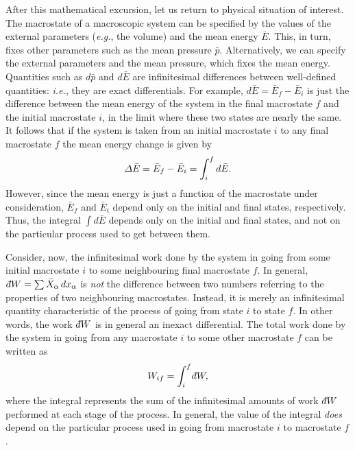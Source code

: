 After this mathematical excursion, let us return to physical situation of interest.
The macrostate of a macroscopic system can be specified by the values of the
external parameters ({\em e.g.}, the volume) and the mean energy $\bar{E}$. This, in
turn, fixes other parameters such as the mean pressure $\bar{p}$. Alternatively,
we can specify the external parameters and the mean pressure, which fixes the 
mean energy. Quantities such as $d\bar{p}$ and $d\bar{E}$ are infinitesimal
differences between well-defined quantities: {\em i.e.},
 they are exact differentials.
For example, $d\bar{E} = \bar{E}_f - \bar{E}_i$ is just the difference between the
mean energy of the system in the final macrostate $f$ and  the
initial macrostate $i$, in the limit where these two states are nearly the same.
It follows that if the system is taken from an initial macrostate $i$ to any
final macrostate $f$ the mean energy change is given by 
\begin{equation}
{\mit\Delta} \bar{E} = \bar{E}_f - \bar{E}_i = \int_{i}^f d\bar{E}.
\end{equation}
However, since the mean energy is just a function of the macrostate under consideration, $\bar{E}_f$ and $\bar{E}_i$ depend only on the  initial and final
states, respectively.
 Thus, the integral $\int d\bar{E}$ depends only on the initial and final
states, and not on the particular process  used to get between them.

Consider, now, the infinitesimal work done by the system in going from some
initial macrostate $i$ to some neighbouring final macrostate $f$. In general, 
$\,\dbar W = \sum \bar{X}_\alpha\,dx_\alpha$ is {\em not}\/ the difference between two
numbers referring to the properties of two neighbouring macrostates. Instead,
it is merely an infinitesimal quantity characteristic of the process of going
from state $i$ to state $f$. In other words, the work $\,\dbar W$ is in general
an inexact differential. The total work done by the system in going from any
macrostate $i$ to some other macrostate $f$ can be written as
\begin{equation}
W_{if} = \int_i^f \dbar W,
\end{equation}
where the integral represents the sum of the infinitesimal amounts of work
$\,\dbar W$ performed at each stage of the process. In general, the value of
the integral {\em does}
 depend on the particular process used in going from macrostate $i$
to macrostate $f$. 

